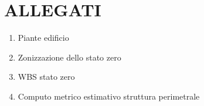 \chapter{ALLEGATI}
\begin{enumerate}
    \item Piante edificio
    \item Zonizzazione dello stato zero
    \item WBS stato zero
    \item Computo metrico estimativo struttura perimetrale
\end{enumerate}
\label{Edificio}


\label{WBS}

\label{STRUTcostoMateriale}

